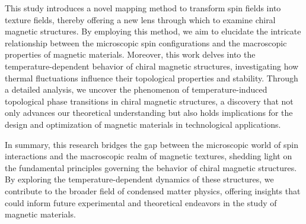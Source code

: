 \documentclass[12pt]{article}
\theoremstyle{problemstyle}
\begin{document}
This study introduces a novel mapping method to transform spin fields into texture fields, thereby offering a new lens through which to examine chiral magnetic structures. By employing this method, we aim to elucidate the intricate relationship between the microscopic spin configurations and the macroscopic properties of magnetic materials. Moreover, this work delves into the temperature-dependent behavior of chiral magnetic structures, investigating how thermal fluctuations influence their topological properties and stability. Through a detailed analysis, we uncover the phenomenon of temperature-induced topological phase transitions in chiral magnetic structures, a discovery that not only advances our theoretical understanding but also holds implications for the design and optimization of magnetic materials in technological applications.

In summary, this research bridges the gap between the microscopic world of spin interactions and the macroscopic realm of magnetic textures, shedding light on the fundamental principles governing the behavior of chiral magnetic structures. By exploring the temperature-dependent dynamics of these structures, we contribute to the broader field of condensed matter physics, offering insights that could inform future experimental and theoretical endeavors in the study of magnetic materials.%

\end{document}
